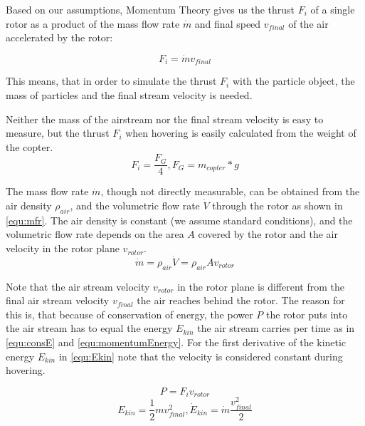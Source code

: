     Based on our assumptions, Momentum Theory gives us the thrust $F_i$ of a single rotor as a product  of the mass flow rate $\dot m$ and final speed $v_{final}$ of the air accelerated by the rotor:  
    
    \begin{equation}
    F_i = \dot m v_{final} 
    \label{equ:momentum}
    \end{equation}
    
    This means, that in order to simulate the thrust $F_i$ with the particle object, the mass of particles and the final stream velocity is needed.
    
    Neither the mass of the airstream nor the final stream velocity is easy to measure, but the thrust $F_i$ when hovering is easily calculated from the weight of the copter.
    \begin{equation}
    F_i = \frac{F_G} {4}, F_G = m_{copter} * g
    \end{equation}
    
    
    The mass flow rate $\dot m$, though not directly measurable,  can be obtained from the air density $\rho_{air}$, and the volumetric flow rate $\dot V$ through the rotor as shown in \ref{equ:mfr}. 
    The air density is constant (we assume standard conditions), and the volumetric flow rate  depends on the area $A$ covered by the rotor and the air velocity in the rotor plane $v_{rotor}$.
    \begin{equation}
    \dot m = \rho_{air} \dot V = \rho_{air} A v_{rotor}
    \label{equ:mfr}
    \end{equation}
    
    Note that the air stream velocity $v_{rotor}$ in the rotor plane is different from the final air stream velocity $v_{final}$ the air reaches behind the rotor. 
    The reason for this is, that because of  conservation of energy, the power $P$ the rotor puts into the air stream has to equal the energy $E_{kin}$ the air stream carries per time as in \ref{equ:consE} and \ref{equ:momentumEnergy}. 
    For the first derivative of the kinetic energy $E_{kin}$ in \ref{equ:Ekin} note that the velocity is considered constant during hovering.
    
    \begin{equation}
    P = F_i v_{rotor}
    \end{equation}
    \begin{equation}
    E_{kin} = \frac{1}{2} m v_{final}^2, \dot E_{kin} = \dot m \frac{v_{final}^2}{2}
    \label{equ:Ekin}
    \end{equation}
    
